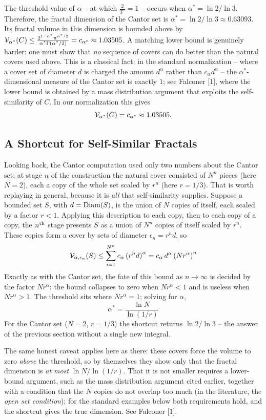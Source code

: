 The threshold value of $\alpha$ -- at which $\frac{2}{3^\alpha} = 1$ --
occurs when $\alpha^* = \ln 2 / \ln 3$. Therefore, the fractal dimension of the
Cantor set is $\alpha^* = \ln 2 / \ln 3 \approx 0.63093$.
Its fractal volume in this
dimension is bounded above by ${\cal V}_{\alpha^*}(C) \le \frac{2^{1-\alpha^*}
\pi^{\alpha^*/2}}{\alpha^* \Gamma(\alpha^* / 2)} = c_{\alpha^*} \approx 1.03505$.
A matching lower bound is genuinely harder: one must show that {\it no\/}
sequence of covers can do better than the natural covers used above. This
is a classical fact: in the standard normalization -- where a cover set of
diameter $d$ is charged the amount $d^\alpha$ rather than
$c_\alpha d^\alpha$ -- the $\alpha^*$-dimensional measure of the Cantor
set is exactly $1$; see Falconer [1], where the lower bound is obtained
by a mass distribution argument that exploits the self-similarity of $C$.
In our normalization this gives
$$
{\cal V}_{\alpha^*}(C) = c_{\alpha^*} \approx 1.03505.
$$

\subsection{A Shortcut for Self-Similar Fractals}
Looking back, the Cantor computation used only two numbers about the
Cantor set: at stage $n$ of the construction the natural cover
consisted of $N^n$ pieces (here $N = 2$), each a copy of the whole set
scaled by $r^n$ (here $r = 1/3$). That is worth replaying in general,
because it is {\it all\/} that self-similarity supplies. Suppose a
bounded set $S$, with $d = {\rm Diam}(S)$, is the union of $N$ copies
of itself, each scaled by a factor $r < 1$. Applying this description
to each copy, then to each copy of a copy, the $n^{\rm th}$ stage
presents $S$ as a union of $N^n$ copies of itself scaled by $r^n$.
These copies form a cover by sets of diameter $\epsilon_n = r^n d$, so
$$
{\cal V}_{\alpha, \epsilon_n}(S) \le \sum_{i=1}^{N^n}
c_\alpha \left(r^n d\right)^\alpha
= c_\alpha \, d^\alpha \left(N r^\alpha\right)^n
$$
Exactly as with the Cantor set, the fate of this bound as
$n \rightarrow \infty$ is decided by the factor $N r^\alpha$: the
bound collapses to zero when $N r^\alpha < 1$ and is useless when
$N r^\alpha > 1$. The threshold sits where $N r^\alpha = 1$; solving
for $\alpha$,
$$
\alpha^* = \frac{\ln N}{\ln (1/r)}
$$
For the Cantor set ($N = 2$, $r = 1/3$) the shortcut returns
$\ln 2 / \ln 3$ -- the answer of the previous section without a single
new integral.

The same honest caveat applies here as there: these covers force the
volume to zero {\it above\/} the threshold, so by themselves they show
only that the fractal dimension is {\it at most\/}
$\ln N / \ln(1/r)$. That it is not smaller requires a lower-bound
argument, such as the mass distribution argument cited earlier,
together with a condition that the $N$ copies do not overlap too much
(in the literature, the {\it open set condition\/}); for the standard
examples below both requirements hold, and the shortcut gives the true
dimension. See Falconer [1].


